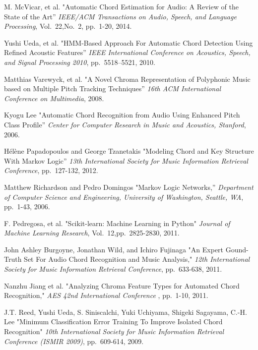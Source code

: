 \documentclass{article}
\begin{document}
\begin{thebibliography}{citations}

M. McVicar, et al.
"Automatic Chord Estimation for Audio: A Review of the State of the Art''
{\it IEEE/ACM Transactions on Audio, Speech, and Language Processing},
Vol.~22,No.~2, pp.~1-20, 2014.

Yushi Ueda, et al.
"HMM-Based Approach For Automatic Chord Detection Using Refined Acoustic Features''
{\it IEEE International Conference on Acoustics, Speech, and Signal Processing 2010},
pp.~5518--5521, 2010.

Matthias Varewyck, et al.
"A Novel Chroma Representation of Polyphonic Music based on Multiple Pitch Tracking Techniques''
{\it 16th ACM International Conference on Multimedia},
2008.

Kyogu Lee
"Automatic Chord Recognition from Audio Using Enhanced Pitch Class Profile''
{\it Center for Computer Research in Music and Acoustics, Stanford},
2006.

Hélène Papadopoulos and George Tzanetakis
"Modeling Chord and Key Structure With Markov Logic''
{\it 13th International Society for Music Information Retrieval Conference},
pp.~127-132, 2012.

Matthew Richardson and Pedro Domingos
"Markov Logic Networks,''
{\it Department of Computer Science and Engineering, University of Washington, Seattle, WA},
pp.~1-43, 2006.

F. Pedregosa, et al.
"Scikit-learn: Machine Learning in Python"
{\it Journal of Machine Learning Research},
Vol.~12,pp.~2825-2830, 2011.

John Ashley Burgoyne, Jonathan Wild, and Ichiro Fujinaga
"An Expert Gound-Truth Set For Audio Chord Recognition and Music Analysis,"
{\it 12th International Society for Music Information Retrieval Conference},
pp.~633-638, 2011.

Nanzhu Jiang et al.
"Analyzing Chroma Feature Types for Automated Chord Recognition,"
{\it AES 42nd International Conference },
pp.~1-10, 2011.

J.T. Reed, Yushi Ueda, S. Siniscalchi, Yuki Uchiyama, Shigeki Sagayama, C.-H. Lee
"Minimum Classification Error Training To Improve Isolated Chord Recognition"
{\it 10th International Society for Music Information Retrieval Conference (ISMIR 2009)},
pp.~609-614, 2009.


\end{thebibliography}
\end{document}
